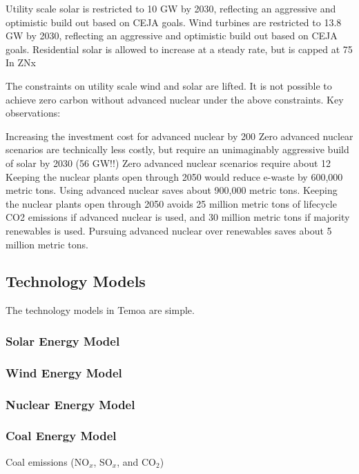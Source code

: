 Utility scale solar is restricted to 10 GW by 2030, reflecting an aggressive and optimistic build out based on CEJA goals.
Wind turbines are restricted to 13.8 GW by 2030, reflecting an aggressive and optimistic build out based on CEJA goals.
Residential solar is allowed to increase at a steady rate, but is capped at 75%
In ZNx

The constraints on utility scale wind and solar are lifted. It is not possible to achieve zero carbon without advanced nuclear under the above constraints.
Key observations:

Increasing the investment cost for advanced nuclear by 200%
Zero advanced nuclear scenarios are technically less costly, but require an unimaginably aggressive build of solar by 2030 (56 GW!!)
Zero advanced nuclear scenarios require about 12%
Keeping the nuclear plants open through 2050 would reduce e-waste by 600,000 metric tons. Using advanced nuclear saves about 900,000 metric tons.
Keeping the nuclear plants open through 2050 avoids 25 million metric tons of lifecycle CO2 emissions if advanced nuclear is used, and 30 million metric tons if majority renewables is used. Pursuing advanced nuclear over renewables saves about 5 million metric tons.
\subsection{Technology Models}
The technology models in Temoa are simple. 
\subsubsection{Solar Energy Model}
\subsubsection{Wind Energy Model}
\subsubsection{Nuclear Energy Model}
\subsubsection{Coal Energy Model}
Coal emissions (NO$_x$, SO$_x$, and CO$_2$)
